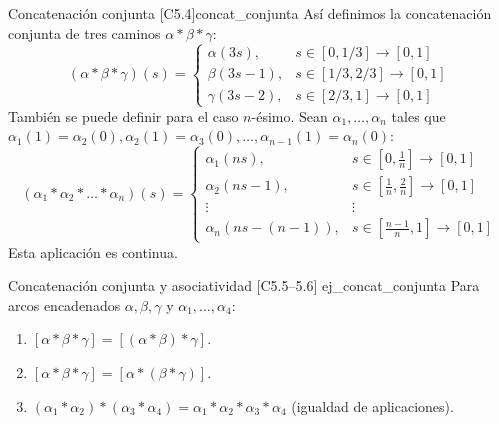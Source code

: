 \begin{definicion}{Concatenación conjunta [C5.4]}{concat_conjunta}
Así definimos la concatenación conjunta de tres caminos $\alpha * \beta * \gamma$:
\[
(\alpha * \beta * \gamma)(s) = 
\begin{cases} 
\alpha(3s), & s \in [0, 1/3] \to [0,1] \\ 
\beta(3s-1), & s \in [1/3, 2/3] \to [0,1] \\ 
\gamma(3s-2), & s \in [2/3, 1] \to [0,1] 
\end{cases}
\]
También se puede definir para el caso $n$-ésimo. Sean $\alpha_1, \dots, \alpha_n$ tales que $\alpha_1(1) = \alpha_2(0), \alpha_2(1) = \alpha_3(0), \dots, \alpha_{n-1}(1) = \alpha_n(0)$:
\[
(\alpha_1 * \alpha_2 * \dots * \alpha_n)(s) = 
\begin{cases} 
\alpha_1(ns), & s \in [0, \frac{1}{n}] \to [0,1] \\ 
\alpha_2(ns-1), & s \in [\frac{1}{n}, \frac{2}{n}] \to [0,1] \\ 
\vdots & \vdots \\ 
\alpha_n(ns-(n-1)), & s \in [\frac{n-1}{n}, 1] \to [0,1] 
\end{cases}
\]
Esta aplicación es continua.
\end{definicion}

\begin{proposicion}{Concatenación conjunta y asociatividad [C5.5--5.6] \marcaE}{ej_concat_conjunta}
Para arcos encadenados $\alpha, \beta, \gamma$ y $\alpha_1, \dots, \alpha_4$:
\begin{enumerate}
    \item $[\alpha * \beta * \gamma] = [(\alpha * \beta) * \gamma]$.
    \item $[\alpha * \beta * \gamma] = [\alpha * (\beta * \gamma)]$.
    \item $(\alpha_1 * \alpha_2) * (\alpha_3 * \alpha_4) = \alpha_1 * \alpha_2 * \alpha_3 * \alpha_4$ (igualdad de aplicaciones).
\end{enumerate}
\end{proposicion}

